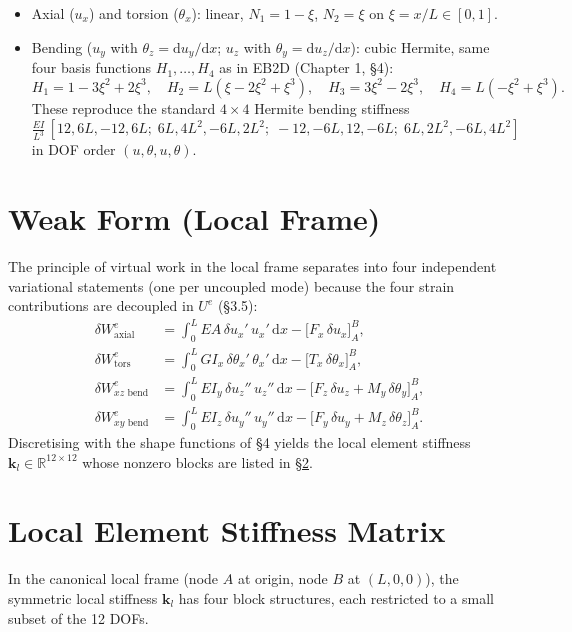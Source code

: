 \documentclass[11pt,a4paper]{article}
\newcommand{\dd}{\mathrm{d}}
\newcommand{\bmath}[1]{\boldsymbol{#1}}
\begin{document}
\begin{itemize}
    \item Axial ($u_x$) and torsion ($\theta_x$): linear, $N_1 = 1 - \xi$, $N_2 = \xi$ on $\xi = x/L \in [0,1]$.
    \item Bending ($u_y$ with $\theta_z = \dd u_y/\dd x$; $u_z$ with $\theta_y = \dd u_z/\dd x$): cubic Hermite, same four basis functions $H_1,\dots,H_4$ as in EB2D (Chapter 1, \S4):
    \[
    H_1 = 1 - 3\xi^2 + 2\xi^3,\quad H_2 = L(\xi - 2\xi^2 + \xi^3),\quad H_3 = 3\xi^2 - 2\xi^3,\quad H_4 = L(-\xi^2 + \xi^3).
    \]
    These reproduce the standard $4\times 4$ Hermite bending stiffness $\frac{EI}{L^3}\,[12, 6L, -12, 6L;\; 6L, 4L^2, -6L, 2L^2;\; -12, -6L, 12, -6L;\; 6L, 2L^2, -6L, 4L^2]$ in DOF order $(u, \theta, u, \theta)$.
\end{itemize}

\section{Weak Form (Local Frame)}\label{sec:weak-form}

The principle of virtual work in the local frame separates into four independent variational statements (one per uncoupled mode) because the four strain contributions are decoupled in $U^e$ (\S3.5):
\begin{align*}
\delta W^e_{\text{axial}}  &= \int_0^L EA\,\delta u_x'\,u_x'\,\dd x  - \bigl[F_x\,\delta u_x\bigr]_A^B, \\
\delta W^e_{\text{tors}}   &= \int_0^L G I_x\,\delta \theta_x'\,\theta_x'\,\dd x - \bigl[T_x\,\delta \theta_x\bigr]_A^B, \\
\delta W^e_{xz\text{ bend}}&= \int_0^L E I_y\,\delta u_z''\,u_z''\,\dd x - \bigl[F_z\,\delta u_z + M_y\,\delta\theta_y\bigr]_A^B, \\
\delta W^e_{xy\text{ bend}}&= \int_0^L E I_z\,\delta u_y''\,u_y''\,\dd x - \bigl[F_y\,\delta u_y + M_z\,\delta\theta_z\bigr]_A^B.
\end{align*}
Discretising with the shape functions of \S4 yields the local element stiffness $\bmath{k}_l \in \mathbb{R}^{12 \times 12}$ whose nonzero blocks are listed in \S\ref{sec:stiffness}.

\section{Local Element Stiffness Matrix}\label{sec:stiffness}

In the canonical local frame (node $A$ at origin, node $B$ at $(L, 0, 0)$), the symmetric local stiffness $\bmath{k}_l$ has four block structures, each restricted to a small subset of the 12 DOFs.
\end{document}

